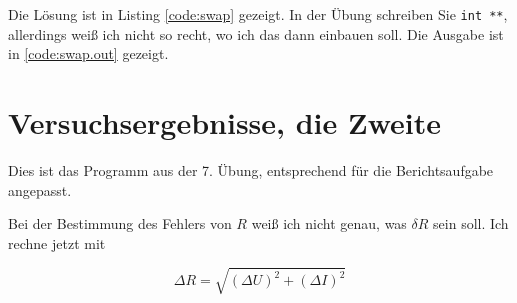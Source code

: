 Die Lösung ist in Listing \ref{code:swap} gezeigt. In der Übung schreiben Sie \texttt{int **}, allerdings weiß ich nicht so recht, wo ich das dann einbauen soll. Die Ausgabe ist in \ref{code:swap.out} gezeigt.


\section{Versuchsergebnisse, die Zweite}

Dies ist das Programm aus der 7. Übung, entsprechend für die Berichtsaufgabe angepasst.

Bei der Bestimmung des Fehlers von $R$ weiß ich nicht genau, was $\delta R$ sein soll. Ich rechne jetzt mit

\begin{equation}
\Delta R = \sqrt{(\Delta U)^2 + (\Delta I)^2}
\end{equation}

